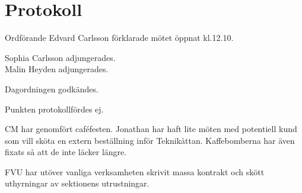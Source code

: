 \documentclass[10pt]{article}
\def\mo{Edvard Carlsson}
\begin{document}
\section*{Protokoll}
\begin{paragrafer}
Ordförande {\mo} förklarade mötet öppnat kl.12.10.

{\valavmo}

{\valavms}

{\valavj}

{\tosg}

Sophia Carlsson adjungerades. \\
Malin Heyden adjungerades.







Dagordningen godkändes.


\textit{\ingaprot}

\begin{fyllnadsval} %
\end{fyllnadsval}

\begin{paragrafer}
Punkten protokollfördes ej.

CM har genomfört caféfesten. Jonathan har haft lite möten med potentiell kund som vill sköta en extern beställning inför Teknikåttan. Kaffebomberna har även fixats så att de inte läcker längre.

FVU har utöver vanliga verksamheten skrivit massa kontrakt och skött uthyrningar av sektionens utrustningar.


\end{paragrafer}
\end{paragrafer}
\end{document}
